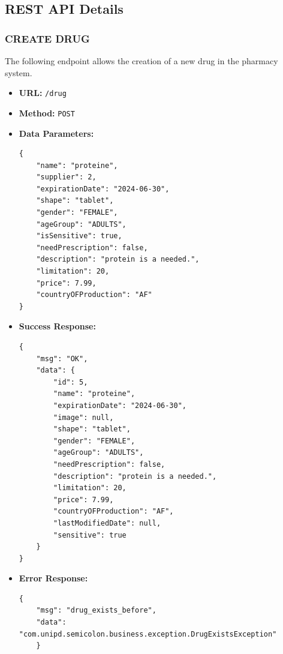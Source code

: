 \newpage
\subsection{REST API Details}


\subsubsection*{CREATE DRUG}

The following endpoint allows the creation of a new drug in the pharmacy system.

\begin{itemize}
    \item \textbf{URL:}
    \newline \hspace*{1cm} \texttt{/drug}  
    \item \textbf{Method:}
    \newline \hspace*{1cm}\texttt{POST}
    \item \textbf{Data Parameters:}
\begin{lstlisting}[breaklines]
{
    "name": "proteine",
    "supplier": 2,
    "expirationDate": "2024-06-30",
    "shape": "tablet",
    "gender": "FEMALE",
    "ageGroup": "ADULTS",
    "isSensitive": true,
    "needPrescription": false,
    "description": "protein is a needed.",
    "limitation": 20,
    "price": 7.99,
    "countryOFProduction": "AF"
}
\end{lstlisting}
    \item \textbf{Success Response:}
\begin{lstlisting}[breaklines]
{
    "msg": "OK",
    "data": {
        "id": 5,
        "name": "proteine",
        "expirationDate": "2024-06-30",
        "image": null,
        "shape": "tablet",
        "gender": "FEMALE",
        "ageGroup": "ADULTS",
        "needPrescription": false,
        "description": "protein is a needed.",
        "limitation": 20,
        "price": 7.99,
        "countryOFProduction": "AF",
        "lastModifiedDate": null,
        "sensitive": true
    }
}
\end{lstlisting}
    \item \textbf{Error Response:}
    \begin{lstlisting}[breaklines]
    {
    "msg": "drug_exists_before",
    "data": "com.unipd.semicolon.business.exception.DrugExistsException"
    }
    \end{lstlisting}
\end{itemize}

